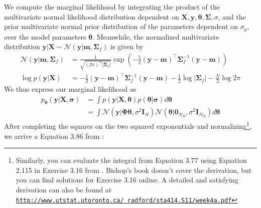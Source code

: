 \documentclass{article}
\begin{document}
We compute the marginal likelihood by integrating the product of the multivariate normal likelihood distribution dependent on $\mathbf{X},\mathbf{y},\boldsymbol{\theta},\boldsymbol{\Sigma}, \sigma$, and the prior multivariate normal prior distribution of the parameters dependent on $\sigma_p$, over the model parameters $\boldsymbol{\theta}$. Meanwhile, the normalized multivariate distribution $\mathbf{y}|\mathbf{X} \sim \mathcal{N}(\mathbf{y}|\mathbf{m},\boldsymbol{\Sigma}_f)$ is given by
\begin{equation}
\begin{split}
    \mathcal{N}(\mathbf{y}|\mathbf{m},\boldsymbol{\Sigma}_f)& =\frac{1}{\sqrt{(2\pi)^N |\boldsymbol{\Sigma}_f|}} \exp \left(-\frac{1}{2}(\mathbf{y}-\mathbf{m})^\top\boldsymbol{\Sigma}_f^{-1}(\mathbf{y}-\mathbf{m})\right) \\
   \log p(\mathbf{y}|\mathbf{X})& = -\frac{1}{2}(\mathbf{y}-\mathbf{m})^\top\boldsymbol{\Sigma}_f^{-1}(\mathbf{y}-\mathbf{m})-\frac{1}{2}\log |\boldsymbol{\Sigma}_f|-\frac{N}{2}\log 2\pi
   \end{split}
\end{equation} We  thus express our marginal likelihood as
\begin{equation}
\begin{split}
    p_{\boldsymbol{\theta}}(\mathbf{y}|\mathbf{X},\boldsymbol{\sigma})&=\int p(\mathbf{y}|\mathbf{X},\boldsymbol{\theta})p(\boldsymbol{\theta}|\boldsymbol{\sigma})d\boldsymbol{\theta} \\
    &= \int \mathcal{N}(\mathbf{y}|\boldsymbol{\Phi}\boldsymbol{\theta},\sigma^2\mathbf{I}_N)\mathcal{N}(\boldsymbol{\theta}|\mathbf{0}_{N_B},\sigma^2\mathbf{I}_{N_B})d\boldsymbol{\theta}
    \end{split}
\end{equation}After completing the squares on the two squared exponentials and normalizing\footnote{Similarly, you can evaluate the integral from Equation 3.77 using Equation 2.115 in Exercise 3.16 from \cite{bishop}. Bishop's book doesn't cover the derivation, but you can find solutions for Exercise 3.16 online. A detailed and satisfying derivation can also be found at \href{ http://www.utstat.utoronto.ca/~radford/sta414.S11/week4a.pdf}{\texttt{http://www.utstat.utoronto.ca/~radford/sta414.S11/week4a.pdf}}}, we arrive a Equation 3.86 from \cite{bishop}: 
\end{document}
